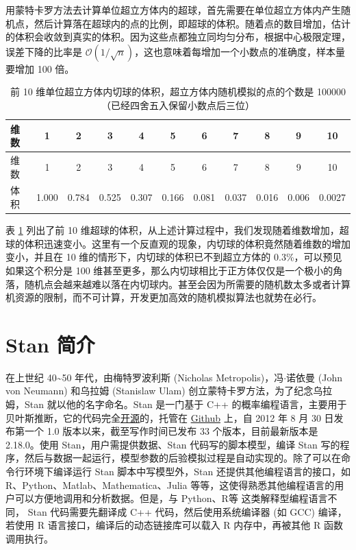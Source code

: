 \documentclass[12pt,a4paper,UTF8,twoside]{book}
\theoremstyle{definition}
\theoremstyle{definition}
\theoremstyle{definition}
\theoremstyle{remark}
\begin{document}
用蒙特卡罗方法去计算单位超立方体内的超球，首先需要在单位超立方体内产生随机点，然后计算落在超球内的点的比例，即超球的体积。随着点的数目增加，估计的体积会收敛到真实的体积。因为这些点都独立同均匀分布，根据中心极限定理，误差下降的比率是
\(\mathcal{O}\left( 1 / \sqrt{n} \right)\)，这也意味着每增加一个小数点的准确度，样本量要增加
100 倍。

\begin{longtable}[]{@{}lcccccccccc@{}}
\caption{\label{tab:calculate-volume-of-hyperball} 前 10
维单位超立方体内切球的体积，超立方体内随机模拟的点的个数是
100000（已经四舍五入保留小数点后三位）}\tabularnewline
\toprule
维数 & 1 & 2 & 3 & 4 & 5 & 6 & 7 & 8 & 9 & 10\tabularnewline
\midrule
\endfirsthead
\toprule
维数 & 1 & 2 & 3 & 4 & 5 & 6 & 7 & 8 & 9 & 10\tabularnewline
\midrule
\endhead
体积 & 1.000 & 0.784 & 0.525 & 0.307 & 0.166 & 0.081 & 0.037 & 0.016 &
0.006 & 0.0027\tabularnewline
\bottomrule
\end{longtable}

表 \ref{tab:calculate-volume-of-hyperball} 列出了前 10
维超球的体积，从上述计算过程中，我们发现随着维数增加，超球的体积迅速变小。这里有一个反直观的现象，内切球的体积竟然随着维数的增加变小，并且在
10 维的情形下，内切球的体积已不到超立方体的
0.3\%，可以预见如果这个积分是 100
维甚至更多，那么内切球相比于正方体仅仅是一个极小的角落，随机点会越来越难以落在内切球内。甚至会因为所需要的随机数太多或者计算机资源的限制，而不可计算，开发更加高效的随机模拟算法也就势在必行。

\hypertarget{sec:stan-samplers}{%
\section{Stan 简介}\label{sec:stan-samplers}}

在上世纪 40\textasciitilde{}50 年代，由梅特罗波利斯 (Nicholas
Metropolis)，冯\(\cdot\)诺依曼 (John von Neumann) 和乌拉姆 (Stanislaw
Ulam) 创立蒙特卡罗方法，为了纪念乌拉姆，Stan 就以他的名字命名。Stan
是一门基于 C++
的概率编程语言，主要用于贝叶斯推断，它的代码完全\href{http://mc-stan.org/}{开源}的，托管在
\href{https://github.com/stan-dev/stan}{Github} 上，自 2012 年 8 月 30
日发布第一个 1.0 版本以来，截至写作时间已发布 33 个版本，目前最新版本是
2.18.0。使用 Stan，用户需提供数据、Stan 代码写的脚本模型，编译 Stan
写的程序，然后与数据一起运行，模型参数的后验模拟过程是自动实现的。除了可以在命令行环境下编译运行
Stan 脚本中写模型外，Stan 还提供其他编程语言的接口，如
R、Python、Matlab、Mathematica、Julia
等等，这使得熟悉其他编程语言的用户可以方便地调用和分析数据。但是，与
Python、R等 这类解释型编程语言不同， Stan 代码需要先翻译成 C++
代码，然后使用系统编译器 (如 GCC) 编译，若使用 R
语言接口，编译后的动态链接库可以载入 R 内存中，再被其他 R 函数调用执行。
\end{document}
